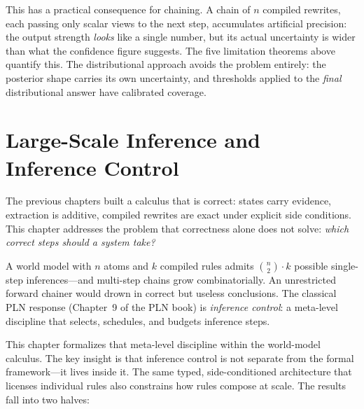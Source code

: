 \documentclass[11pt,openany]{report}
\begin{document}
This has a practical consequence for chaining.  A chain of $n$
compiled rewrites, each passing only scalar views to the next step,
accumulates artificial precision: the output strength \emph{looks}
like a single number, but its actual uncertainty is wider than
what the confidence figure suggests.  The five limitation theorems
above quantify this.  The distributional approach avoids the
problem entirely: the posterior shape carries its own uncertainty,
and thresholds applied to the \emph{final} distributional answer
have calibrated coverage.



\chapter{Large-Scale Inference and Inference Control}
\label{ch:scale-control}

The previous chapters built a calculus that is correct: states carry
evidence, extraction is additive, compiled rewrites are exact under
explicit side conditions.  This chapter addresses the problem that
correctness alone does not solve: \emph{which correct steps should a
system take?}

A world model with $n$ atoms and $k$ compiled rules admits
$\binom{n}{2} \cdot k$ possible single-step inferences---and
multi-step chains grow combinatorially.  An unrestricted forward
chainer would drown in correct but useless conclusions.  The
classical PLN response (Chapter~9 of the PLN book) is
\emph{inference control}: a meta-level discipline that selects,
schedules, and budgets inference steps.

This chapter formalizes that meta-level discipline within the
world-model calculus.  The key insight is that inference control is
not separate from the formal framework---it lives inside it.  The
same typed, side-conditioned architecture that licenses individual
rules also constrains how rules compose at scale.  The results fall
into two halves:
\end{document}
